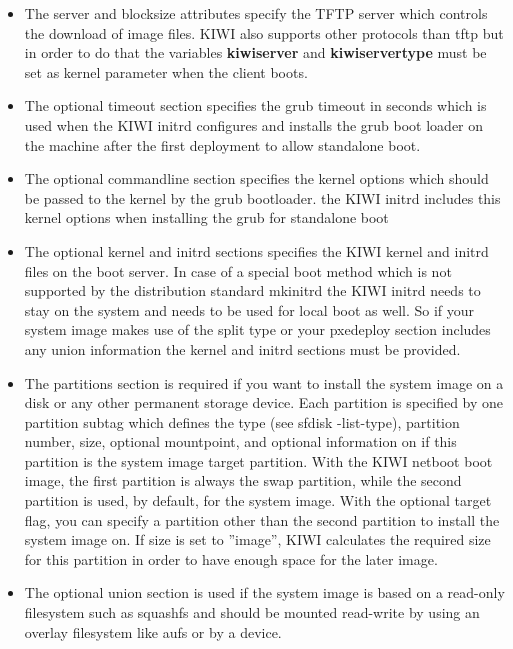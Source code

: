 \begin{itemize}
	\begin {itemize}
	\item The server and blocksize attributes specify the TFTP server which
      controls the download of image files. KIWI also supports other protocols
      than tftp but in order to do that the variables \textbf{kiwiserver} and
      \textbf{kiwiservertype} must be set as kernel parameter when the client
      boots.
	\item The optional timeout section specifies the grub timeout in seconds
      which is used when the KIWI initrd configures and installs the grub boot
      loader on the machine after the first deployment to allow standalone
      boot.
	\item The optional commandline section specifies the kernel options which
      should be passed to the kernel by the grub bootloader. the KIWI
      initrd includes this kernel options when installing the grub for
      standalone boot
	\item The optional kernel and initrd sections specifies the KIWI
      kernel and initrd files on the boot server. In case of a special boot
      method which is not supported by the distribution standard mkinitrd
      the KIWI initrd needs to stay on the system and needs to be used for
      local boot as well. So if your system image makes use of the split
      type or your pxedeploy section includes any union information the
      kernel and initrd sections must be provided.
	\item The partitions section is required if you want to install the system
      image on a disk or any other permanent storage device. Each partition is
      specified by one partition subtag which defines the type (see
      sfdisk -list-type), partition number, size, optional mountpoint, and
      optional information on if this partition is the system image
      target partition. With the KIWI netboot boot image, the first
      partition is always the swap partition, while the second partition
      is used, by default, for the system image. With the optional
      target flag, you can specify a partition other than the second
      partition to install the system image on. If size is set to ''image'',
      KIWI calculates the required size for this partition in order to
      have enough space for the later image.
	\item The optional union section is used if the system image is based
      on a read-only filesystem such as squashfs and should be mounted
      read-write by using an overlay filesystem like aufs or by a device.

\end{itemize}
\end{itemize}
